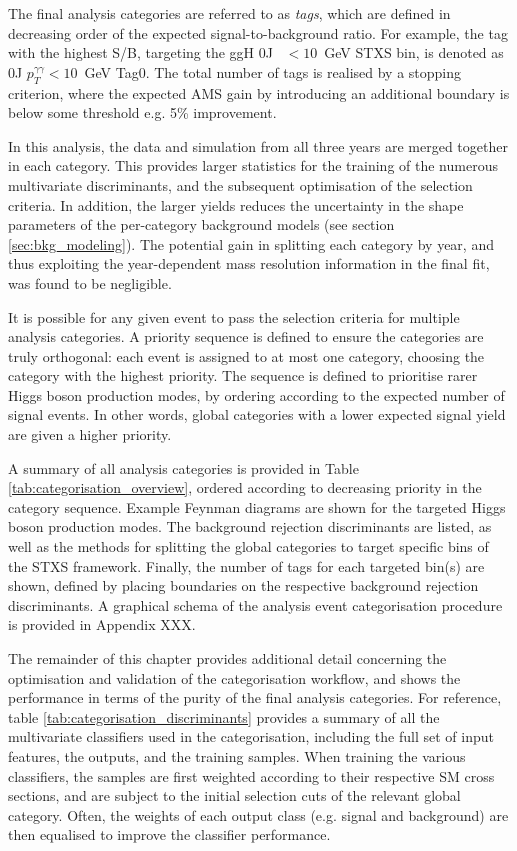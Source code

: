 \begin{enumerate}
    The final analysis categories are referred to as \textit{tags}, which are defined in decreasing order of the expected signal-to-background ratio. For example, the tag with the highest S/B, targeting the ggH 0J \ptH~$<10$~GeV STXS bin, is denoted as 0J $p_T^{\gamma\gamma}<10$~GeV Tag0. The total number of tags is realised by a stopping criterion, where the expected AMS gain by introducing an additional boundary is below some threshold e.g. 5\% improvement.
\end{enumerate}

In this analysis, the data and simulation from all three years are merged together in each category. This provides larger statistics for the training of the numerous multivariate discriminants, and the subsequent optimisation of the selection criteria. In addition, the larger yields reduces the uncertainty in the shape parameters of the per-category background models (see section \ref{sec:bkg_modeling}). The potential gain in splitting each category by year, and thus exploiting the year-dependent mass resolution information in the final fit, was found to be negligible. 

It is possible for any given event to pass the selection criteria for multiple analysis categories. A priority sequence is defined to ensure the categories are truly orthogonal: each event is assigned to at most one category, choosing the category with the highest priority. The sequence is defined to prioritise rarer Higgs boson production modes, by ordering according to the expected number of signal events. In other words, global categories with a lower expected signal yield are given a higher priority.

A summary of all analysis categories is provided in Table \ref{tab:categorisation_overview}, ordered according to decreasing priority in the category sequence. Example Feynman diagrams are shown for the targeted Higgs boson production modes. The background rejection discriminants are listed, as well as the methods for splitting the global categories to target specific bins of the STXS framework. Finally, the number of tags for each targeted bin(s) are shown, defined by placing boundaries on the respective background rejection discriminants. A graphical schema of the analysis event categorisation procedure is provided in Appendix XXX.

The remainder of this chapter provides additional detail concerning the optimisation and validation of the categorisation workflow, and shows the performance in terms of the purity of the final analysis categories. For reference, table \ref{tab:categorisation_discriminants} provides a summary of all the multivariate classifiers used in the categorisation, including the full set of input features, the outputs, and the training samples. When training the various classifiers, the samples are first weighted according to their respective SM cross sections, and are subject to the initial selection cuts of the relevant global category. Often, the weights of each output class (e.g. signal and background) are then equalised to improve the classifier performance.

